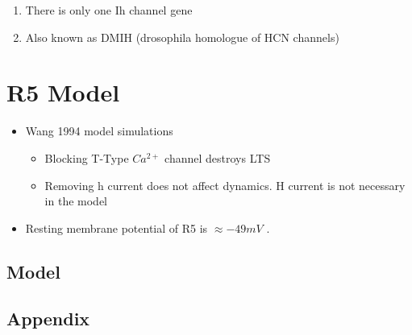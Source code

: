 \documentclass[../../workflow.tex]{subfiles}
\begin{document}
\color{red}
    \begin{enumerate}
        \item There is only one Ih channel gene \cite{chenFunctionalStudyHyperpolarization2012,gisselmannVariantsDrosophilaMelanogaster2005}
        \item Also known as DMIH (drosophila homologue of HCN channels)
    \end{enumerate}

\color{black}

\section{R5 Model}
\etocignoretoctocdepth %
\etocsettocstyle{\subsection*{\contentsname}}{}
\localtableofcontents

\color{red}
\begin{itemize}
    \item Wang 1994 model simulations
    \begin{itemize}
        \item Blocking T-Type $Ca^{2+}$ channel destroys LTS
        \item Removing h current does not affect dynamics. H current is not
        necessary in the model
    \end{itemize}

    \item Resting membrane potential of R5 is $\approx -49 mV$ \cite{raccugliaNetworkSpecificSynchronizationElectrical2019}.
\end{itemize}

\color{black}

\subsection{Model}

\newpage
\subsection{Appendix}
\end{document}
